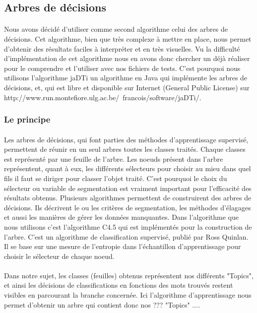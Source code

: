 \subsection{Arbres de décisions}

\paragraph{}
Nous avons décidé d'utiliser comme second algorithme celui des arbres de décisions. Cet algorithme, bien que très complexe à mettre en place, nous permet d'obtenir des résultats faciles à interpréter et en très visuelles.
Vu la difficulté d'implémentation de cet algorithme nous en avons donc chercher un déjà réaliser pour le comprendre et l'utiliser avec nos fichiers de tests. C'est pourquoi nous utilisons l'algorithme jaDTi un algorithme en Java qui implémente les arbres de décisions, et, qui est libre et disponible sur Internet (General Public License) sur http://www.run.montefiore.ulg.ac.be/~francois/software/jaDTi/.


\subsubsection{Le principe}

\paragraph{}
Les arbres de décisions, qui font parties des méthodes d’apprentissage supervisé,  permettent  de réunir en un seul arbres toutes les classes traités. Chaque classes est représenté par une feuille de l'arbre. Les noeuds présent dans l'arbre représentent, quant à eux, les différents sélecteurs pour choisir au mieu dans quel fils il faut se diriger pour classer l'objet traité. C'est pourquoi le choix du sélecteur ou variable de segmentation est vraiment important pour l'efficacité des résultats obtenus.  
Plusieurs algorithmes permettent de construirent des arbres de décisions. Ils  décrivent le ou les critères de segmentation, les méthodes d'élagages et aussi  les manières de gérer les données manquantes.
Dans l'algorithme que nous utilisons c'est l'algorithme C4.5 qui est implémentés pour la construction de l'arbre. C'est un algorithme de classification supervisé, publié par Ross Quinlan. Il se base sur une mesure de l'entropie dans l'échantillon d'apprentissage pour choisir le sélecteur de chaque noeud.

\paragraph{}
Dans notre sujet,  les classes (feuilles) obtenus représentent nos différents "Topics",  et ainsi  les décisions de classifications en fonctions des mots trouvés restent visibles en parcourant la branche concernée.
Ici l'algorithme d'apprentissage nous permet d'obtenir un arbre qui contient donc nos ??? "Topics" ....


